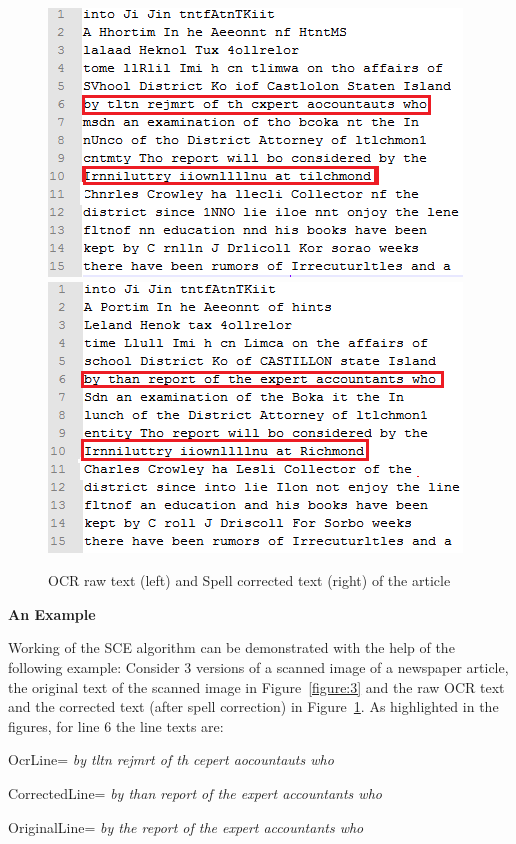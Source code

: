 \documentclass[letterpaper,11pt]{report}
\begin{document}
\begin{figure} [!htb]
\includegraphics[scale=0.75]{ocr3}
\includegraphics[scale=0.75]{corrected3}
\caption{OCR raw text (left) and Spell corrected text (right) of the article}
\label{figure:4}
\end{figure} 


\textbf{An Example}


Working of the SCE algorithm can be demonstrated with the help of the following example:
Consider 3 versions of a scanned image of a newspaper article,  the original text of the scanned image in Figure~\ref{figure:3} and the raw OCR text and the corrected text (after spell correction) in Figure~\ref{figure:4}. As highlighted in the figures, for line 6 the line texts are:

 OcrLine= \textit{by tltn rejmrt of th cepert aocountauts who}

CorrectedLine= \textit{by than report of the expert accountants who}

OriginalLine= \textit{by the report of the expert accountants who} 
\end{document}
